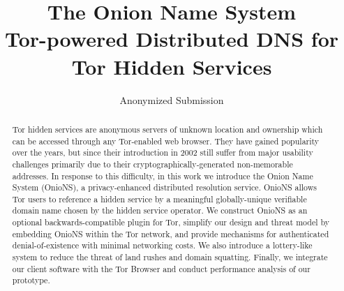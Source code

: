 \documentclass[USenglish,oneside,twocolumn]{article}
\begin{document}
\author[1]{Anonymized Submission}


\title{\huge The Onion Name System \large \\ Tor-powered Distributed DNS for Tor Hidden Services}

\begin{abstract} {
Tor hidden services are anonymous servers of unknown location and ownership which can be accessed through any Tor-enabled web browser. They have gained popularity over the years, but since their introduction in 2002 still suffer from major usability challenges primarily due to their cryptographically-generated non-memorable addresses. \newline \hspace*{1em} In response to this difficulty, in this work we introduce the Onion Name System (OnioNS), a privacy-enhanced distributed resolution service. OnioNS allows Tor users to reference a hidden service by a meaningful globally-unique verifiable domain name chosen by the hidden service operator. We construct OnioNS as an optional backwards-compatible plugin for Tor, simplify our design and threat model by embedding OnioNS within the Tor network, and provide mechanisms for authenticated denial-of-existence with minimal networking costs. We also introduce a lottery-like system to reduce the threat of land rushes and domain squatting. Finally, we integrate our client software with the Tor Browser and conduct performance analysis of our prototype. %
}
\end{abstract}
  
\end{document}
